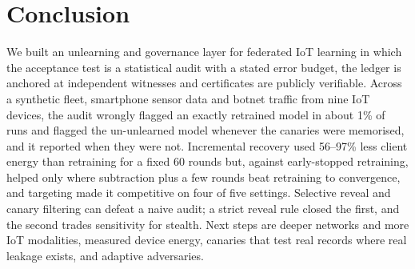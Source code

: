 \documentclass[journal]{IEEEtran}
\begin{document}
\section{Conclusion}
We built an unlearning and governance layer for federated IoT learning in which the acceptance test is a statistical audit with a stated error budget, the ledger is anchored at independent witnesses and certificates are publicly verifiable. Across a synthetic fleet, smartphone sensor data and botnet traffic from nine IoT devices, the audit wrongly flagged an exactly retrained model in about 1\% of runs and flagged the un-unlearned model whenever the canaries were memorised, and it reported when they were not. Incremental recovery used 56--97\% less client energy than retraining for a fixed 60 rounds but, against early-stopped retraining, helped only where subtraction plus a few rounds beat retraining to convergence, and targeting made it competitive on four of five settings. Selective reveal and canary filtering can defeat a naive audit; a strict reveal rule closed the first, and the second trades sensitivity for stealth. Next steps are deeper networks and more IoT modalities, measured device energy, canaries that test real records where real leakage exists, and adaptive adversaries.



\end{document}
